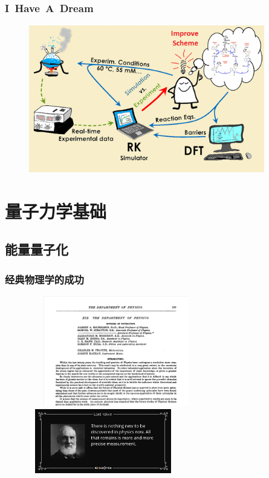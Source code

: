 \frame
{
	\frametitle{\rm{I~Have~A~Dream}}
\begin{figure}[h!]
\vspace*{-0.18in}
\centering
\includegraphics[height=2.55in,width=4.05in]{Figures/Schematic_Material-Design.png}
\label{Schematic_Material-Design}
\end{figure}
}

\section{量子力学基础}
\subsection{能量量子化}
\frame
{
	\frametitle{经典物理学的成功}
\begin{figure}[h!]
\vspace*{-0.18in}
\centering
\includegraphics[height=1.90in,width=3.00in,viewport=0 0 1150 690,clip]{Figures/Albert_Michelson-Quotes.jpg}
\includegraphics[height=1.10in,width=2.55in,viewport=0 0 880 400,clip]{Figures/Quote-there-is-nothing-new-to-be-discovered-in-physics-now-all-that-remains-is-more-and-more-lord-kelvin-57-38-79.jpg}
\label{two_Dark_Clouds}
\end{figure}
}

